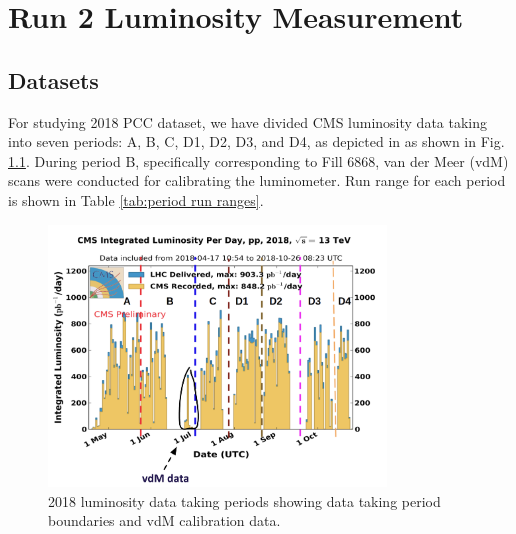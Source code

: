 \chapter{Run 2 Luminosity Measurement}  %

\ifpdf
    \graphicspath{{Chapter4/Figs/Raster/}{Chapter4/Figs/PDF/}{Chapter4/Figs/}}
\else
    \graphicspath{{Chapter4/Figs/Vector/}{Chapter4/Figs/}}
\fi





\section{Datasets}

For studying 2018 PCC dataset, we have divided CMS luminosity data taking into seven periods: A, B, C, D1, D2, D3, and D4, as depicted in %
as shown in Fig. \ref{fig:period_bound}. During period B, specifically corresponding to Fill 6868, van der Meer (vdM) scans were conducted for calibrating the luminometer.
Run range for each period is shown in Table \ref{tab:period run ranges}. 

\begin{figure}[!htp]
\centering
\includegraphics[width=0.8\textwidth]{ashish_thesis/period_boundary.png}
\caption{%
   2018 luminosity data taking periods showing data taking period boundaries and vdM calibration data.
}
\label{fig:period_bound}
\end{figure}


